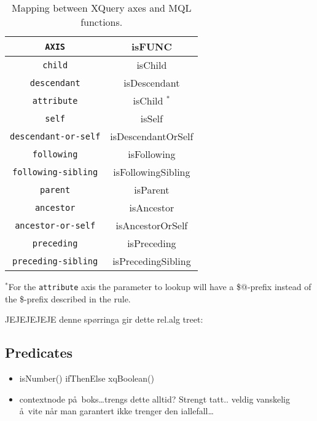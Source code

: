\begin{table}[h]
\centering
\begin{tabular}{c|c}
\texttt{AXIS} & \textsf{isFUNC} \\ \hline
\texttt{child} & \textsf{isChild} \\
\texttt{descendant} & \textsf{isDescendant} \\
\texttt{attribute} & \textsf{isChild} $^{*}$ \\
\texttt{self} & \textsf{isSelf} \\
\texttt{descendant-or-self} & \textsf{isDescendantOrSelf} \\
\texttt{following} & \textsf{isFollowing} \\
\texttt{following-sibling} & \textsf{isFollowingSibling} \\
\texttt{parent} & \textsf{isParent} \\
\texttt{ancestor} & \textsf{isAncestor} \\
\texttt{ancestor-or-self} & \textsf{isAncestorOrSelf} \\
\texttt{preceding} & \textsf{isPreceding} \\
\texttt{preceding-sibling} & \textsf{isPrecedingSibling} 
\end{tabular}
\caption{Mapping between XQuery axes and MQL functions. \label{tab:trans:TD:axisMap}}
\end{table}

$^{*}$For the \texttt{attribute} axis the parameter to \textsf{lookup} will have a \textsf{\$@}-prefix
instead of the \textsf{\$}-prefix described in the rule.

\begin{myExample}
JEJEJEJEJE
denne sp\o rringa gir dette rel.alg treet:

\end{myExample}

\subsection{Predicates}
\label{sect:trans:TD:predicates}
\begin{itemize}
  \item isNumber() ifThenElse xqBoolean()
  \item contextnode p\aa~boks\ldots trengs dette alltid? Strengt tatt.. veldig vanskelig \aa~vite n\aa r man
  garantert ikke trenger den iallefall\ldots
\end{itemize}
